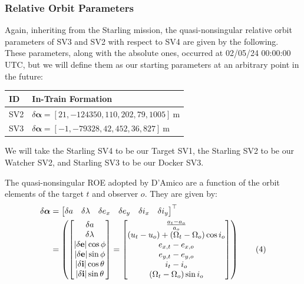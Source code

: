 \subsubsection{Relative Orbit Parameters}
Again, inheriting from the Starling mission, the quasi-nonsingular relative orbit parameters of SV3 and SV2 with respect to SV4 are given by the following. These parameters, along with the absolute ones, occurred at 02/05/24 00:00:00 UTC, but we will define them as our starting parameters at an arbitrary point in the future: 
\begin{table}[h!]
\centering
\begin{tabular}{ll}
\toprule
\textbf{ID} & \textbf{In-Train Formation} \\
\midrule
SV2 & $\delta\boldsymbol{\alpha} = [21, -124350, 110, 202, 79, 1005]~\text{m}$ \\
SV3 & $\delta\boldsymbol{\alpha} = [-1, -79328, 42, 452, 36, 827]~\text{m}$ \\
\bottomrule
\end{tabular}
\end{table}

We will take the Starling SV4 to be our Target SV1, the Starling SV2 to be our Watcher SV2, and Starling SV3 to be our Docker SV3. 

The quasi-nonsingular ROE adopted by D'Amico \cite{damicothesis} are a function of the orbit elements of the target $t$ and observer $o$. They are given by:
\begin{align}
\delta \boldsymbol{\alpha} &= 
\begin{bmatrix}
\delta a & \delta \lambda & \delta e_x & \delta e_y & \delta i_x & \delta i_y
\end{bmatrix}^\top \notag \\
&= 
\left( 
\begin{bmatrix}
\delta a \\
\delta \lambda \\
|\delta\mathbf{e}| \cos \phi \\
|\delta\mathbf{e}| \sin \phi \\
|\delta\mathbf{i}| \cos \theta \\
|\delta\mathbf{i}| \sin \theta
\end{bmatrix}
= 
\begin{bmatrix}
\frac{a_t - a_o}{a_o} \\
(u_t - u_o) + (\Omega_t - \Omega_o) \cos i_o \\
e_{x,t} - e_{x,o} \\
e_{y,t} - e_{y,o} \\
i_t - i_o \\
(\Omega_t - \Omega_o) \sin i_o
\end{bmatrix}
\right) \tag{4}
\end{align}

